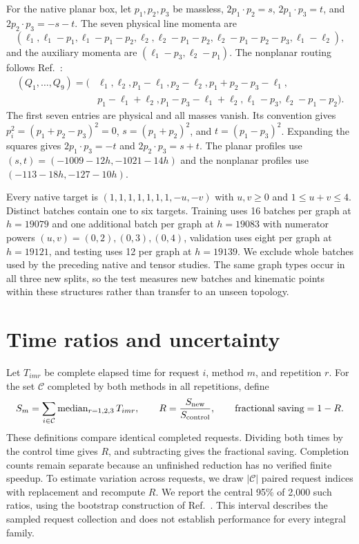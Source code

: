 \documentclass[11pt,a4paper]{article}
\begin{document}
For the native planar box, let $p_1,p_2,p_3$ be massless, $2p_1\cdot p_2=s$, $2p_1\cdot p_3=t$, and $2p_2\cdot p_3=-s-t$. The seven physical line momenta are
\begin{equation}
 (\ell_1,\ell_1-p_1,\ell_1-p_1-p_2,\ell_2,
 \ell_2-p_1-p_2,\ell_2-p_1-p_2-p_3,\ell_1-\ell_2),
 \label{notes-light-eq:planar-input}
\end{equation}
and the auxiliary momenta are $(\ell_1-p_3,\ell_2-p_1)$. The nonplanar routing follows Ref.~\cite{KiraOriginal}:
\begin{align}
 (Q_1,\ldots,Q_9)=(&\ell_1,\ell_2,p_1-\ell_1,p_2-\ell_2,
 p_1+p_2-p_3-\ell_1,\nonumber\\
 &p_1-\ell_1+\ell_2,p_1-p_3-\ell_1+\ell_2,
 \ell_1-p_3,\ell_2-p_1-p_2).
 \label{notes-light-eq:nonplanar-input}
\end{align}
The first seven entries are physical and all masses vanish. Its convention gives $p_i^2=(p_1+p_2-p_3)^2=0$, $s=(p_1+p_2)^2$, and $t=(p_1-p_3)^2$. Expanding the squares gives $2p_1\cdot p_3=-t$ and $2p_2\cdot p_3=s+t$. The planar profiles use $(s,t)=(-1009-12h,-1021-14h)$ and the nonplanar profiles use $(-113-18h,-127-10h)$.

Every native target is $(1,1,1,1,1,1,1,-u,-v)$ with $u,v\geq0$ and $1\leq u+v\leq4$. Distinct batches contain one to six targets. Training uses 16 batches per graph at $h=19079$ and one additional batch per graph at $h=19083$ with numerator powers $(u,v)=(0,2),(0,3),(0,4)$, validation uses eight per graph at $h=19121$, and testing uses 12 per graph at $h=19139$. We exclude whole batches used by the preceding native and tensor studies. The same graph types occur in all three new splits, so the test measures new batches and kinematic points within these structures rather than transfer to an unseen topology.

\section{Time ratios and uncertainty}
\label{notes-light-app:statistics}
Let $T_{imr}$ be complete elapsed time for request $i$, method $m$, and repetition $r$. For the set $\mathcal C$ completed by both methods in all repetitions, define
\begin{equation}
 S_m=\sum_{i\in\mathcal C}\operatorname{median}_{r=1,2,3}T_{imr},\qquad
 R=\frac{S_{\rm new}}{S_{\rm control}},\qquad
 \text{fractional saving}=1-R.
 \label{notes-light-eq:time-ratio}
\end{equation}
These definitions compare identical completed requests. Dividing both times by the control time gives $R$, and subtracting gives the fractional saving. Completion counts remain separate because an unfinished reduction has no verified finite speedup. To estimate variation across requests, we draw $|\mathcal C|$ paired request indices with replacement and recompute $R$. We report the central 95\% of 2,000 such ratios, using the bootstrap construction of Ref.~\cite{Efron1979}. This interval describes the sampled request collection and does not establish performance for every integral family.
\end{document}

